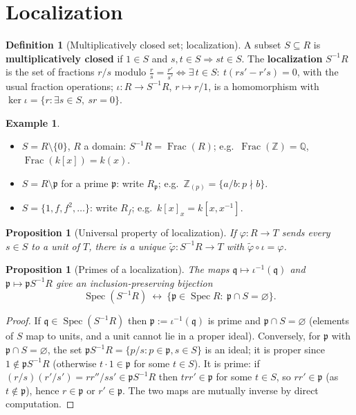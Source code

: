 \documentclass[11pt,a4paper]{article}
\newtheorem{proposition}[theorem]{Proposition}
\theoremstyle{definition}
\newtheorem{definition}[theorem]{Definition}
\newtheorem{example}[theorem]{Example}
\newcommand{\Z}{\mathbb{Z}}
\newcommand{\Q}{\mathbb{Q}}
\newcommand{\Spec}{\operatorname{Spec}}
\newcommand{\Frac}{\operatorname{Frac}}
\newcommand{\p}{\mathfrak{p}}
\newcommand{\q}{\mathfrak{q}}
\begin{document}
	\section{Localization}
	
	\begin{definition}[Multiplicatively closed set; localization]
		A subset $S\subseteq R$ is \textbf{multiplicatively closed} if $1\in S$ and $s,t\in S\Rightarrow st\in S$.
		The \textbf{localization} $S^{-1}R$ is the set of fractions $r/s$ modulo
		$\frac{r}{s}=\frac{r'}{s'}\iff \exists\,t\in S:\ t(rs'-r's)=0$, with the usual fraction operations;
		$\iota:R\to S^{-1}R$, $r\mapsto r/1$, is a homomorphism with $\ker\iota=\{r:\exists s\in S,\ sr=0\}$.
	\end{definition}
	
	\begin{example}
		\begin{itemize}
			\item $S=R\setminus\{0\}$, $R$ a domain: $S^{-1}R=\Frac(R)$; e.g.\ $\Frac(\Z)=\Q$, $\Frac(k[x])=k(x)$.
			\item $S=R\setminus\p$ for a prime $\p$: write $R_\p$; e.g.\ $\Z_{(p)}=\{a/b:p\nmid b\}$.
			\item $S=\{1,f,f^2,\dots\}$: write $R_f$; e.g.\ $k[x]_x=k[x,x^{-1}]$.
		\end{itemize}
	\end{example}
	
	\begin{proposition}[Universal property of localization]
		If $\varphi:R\to T$ sends every $s\in S$ to a unit of $T$, there is a unique $\tilde\varphi:S^{-1}R\to T$
		with $\tilde\varphi\circ\iota=\varphi$.
	\end{proposition}
	
	\begin{proposition}[Primes of a localization]\label{prop:loc-primes}
		The maps $\q\mapsto\iota^{-1}(\q)$ and $\p\mapsto\p S^{-1}R$ give an inclusion-preserving bijection
		\[
		\Spec(S^{-1}R)\ \longleftrightarrow\ \{\p\in\Spec R:\ \p\cap S=\varnothing\}.
		\]
	\end{proposition}
	\begin{proof}
		If $\q\in\Spec(S^{-1}R)$ then $\p:=\iota^{-1}(\q)$ is prime and $\p\cap S=\varnothing$ (elements of $S$
		map to units, and a unit cannot lie in a proper ideal). Conversely, for $\p$ with $\p\cap S=\varnothing$,
		the set $\p S^{-1}R=\{p/s:p\in\p,s\in S\}$ is an ideal; it is proper since $1\notin\p S^{-1}R$
		(otherwise $t\cdot1\in\p$ for some $t\in S$). It is prime: if $(r/s)(r'/s')=rr''/ss'\in\p S^{-1}R$ then
		$t rr'\in\p$ for some $t\in S$, so $rr'\in\p$ (as $t\notin\p$), hence $r\in\p$ or $r'\in\p$. The two maps
		are mutually inverse by direct computation.
	\end{proof}
	
\end{document}
